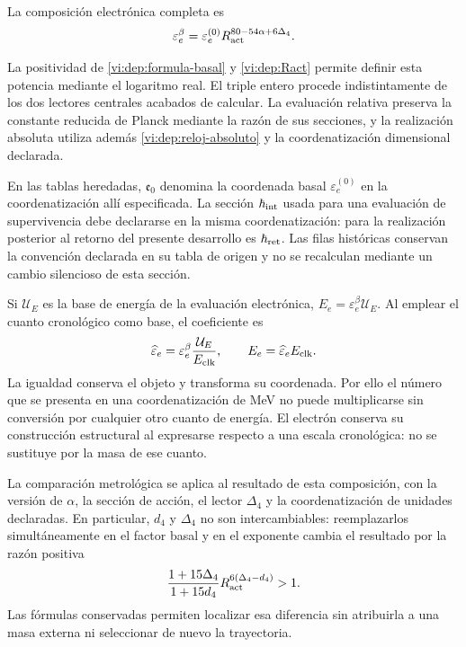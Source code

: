 \begin{definition}
La composición electrónica completa es
\begin{equation}
 \varepsilon_e^\beta
  =\varepsilon_e^{(0)}
      R_{\rm act}^{80-54\alpha+6\Delta_4}.
 \label{vi:dep:electron-beta}
\end{equation}
\end{definition}
La positividad de \eqref{vi:dep:formula-basal} y
\eqref{vi:dep:Ract} permite definir esta potencia mediante el
logaritmo real. El triple entero procede indistintamente de los dos
lectores centrales acabados de calcular. La evaluación relativa
preserva la constante reducida de Planck mediante la razón de sus
secciones, y la realización absoluta utiliza además
\eqref{vi:dep:reloj-absoluto} y la coordenatización dimensional declarada.

En las tablas heredadas, \(\mathfrak e_0\) denomina la
coordenada basal \(\varepsilon_e^{(0)}\) en la coordenatización allí
especificada. La sección \(\hbar_{\rm int}\) usada para una
evaluación de supervivencia debe declararse en la misma coordenatización:
para la realización posterior al retorno del presente desarrollo
es \(\hbar_{\rm ret}\). Las filas históricas conservan la
convención declarada en su tabla de origen y no se recalculan mediante un
cambio silencioso de esta sección.

Si \(\mathcal U_E\) es la base de energía de la evaluación
electrónica, \(E_e=\varepsilon_e^\beta\mathcal U_E\). Al emplear
el cuanto cronológico como base, el coeficiente es
\[
 \widehat\varepsilon_e
   =\varepsilon_e^\beta\frac{\mathcal U_E}{E_{\rm clk}},
 \qquad E_e=\widehat\varepsilon_e E_{\rm clk}.
\]
La igualdad conserva el objeto y transforma su coordenada. Por ello
el número que se presenta en una coordenatización de MeV no puede multiplicarse
sin conversión por cualquier otro cuanto de energía. El electrón
conserva su construcción estructural al expresarse respecto a una
escala cronológica: no se sustituye por la masa de ese cuanto.

La comparación metrológica se aplica al resultado de esta composición,
con la versión de \(\alpha\), la sección de acción, el lector
\(\Delta_4\) y la coordenatización de unidades declaradas. En particular,
\(d_4\) y \(\Delta_4\) no son intercambiables: reemplazarlos
simultáneamente en el factor basal y en el exponente cambia el
resultado por la razón positiva
\[
 \frac{1+15\Delta_4}{1+15d_4}
 R_{\rm act}^{6(\Delta_4-d_4)}>1.
\]
Las fórmulas conservadas permiten localizar esa diferencia sin
atribuirla a una masa externa ni seleccionar de nuevo la trayectoria.
